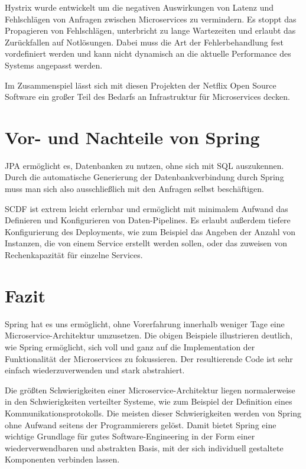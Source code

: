\documentclass{article}
\begin{document}
Hystrix wurde entwickelt um die negativen Auswirkungen von Latenz und Fehlschlägen von Anfragen zwischen Microservices zu vermindern.
Es stoppt das Propagieren von Fehlschlägen, unterbricht zu lange Wartezeiten und erlaubt das Zurückfallen auf Notlösungen.
Dabei muss die Art der Fehlerbehandlung fest vordefiniert werden und kann nicht dynamisch an die aktuelle Performance des Systems angepasst werden.\medskip

Im Zusammenspiel lässt sich mit diesen Projekten der Netflix Open Source Software ein großer Teil des Bedarfs an Infrastruktur für Microservices decken.

\section{Vor- und Nachteile von Spring}

JPA ermöglicht es, Datenbanken zu nutzen, ohne sich mit SQL auszukennen.
Durch die automatische Generierung der Datenbankverbindung durch Spring muss man sich also ausschließlich mit den Anfragen selbst beschäftigen.

SCDF ist extrem leicht erlernbar und ermöglicht mit minimalem Aufwand das Definieren und Konfigurieren von Daten-Pipelines.
Es erlaubt außerdem tiefere Konfigurierung des Deployments, wie zum Beispiel das Angeben der Anzahl von Instanzen, die von einem Service erstellt werden sollen, oder das zuweisen von Rechenkapazität für einzelne Services.

\section{Fazit}

Spring hat es uns ermöglicht, ohne Vorerfahrung innerhalb weniger Tage eine Microservice-Architektur umzusetzen.
Die obigen Beispiele illustrieren deutlich, wie Spring ermöglicht, sich voll und ganz auf die Implementation der Funktionalität der Microservices zu fokussieren.
Der resultierende Code ist sehr einfach wiederzuverwenden und stark abstrahiert.

Die größten Schwierigkeiten einer Microservice-Architektur liegen normalerweise in den Schwierigkeiten verteilter Systeme, wie zum Beispiel der Definition eines Kommunikationsprotokolls.
Die meisten dieser Schwierigkeiten werden von Spring ohne Aufwand seitens der Programmierers gelöst.
Damit bietet Spring eine wichtige Grundlage für gutes Software-Engineering in der Form einer wiederverwendbaren und abstrakten Basis, mit der sich individuell gestaltete Komponenten verbinden lassen.



\end{document}
